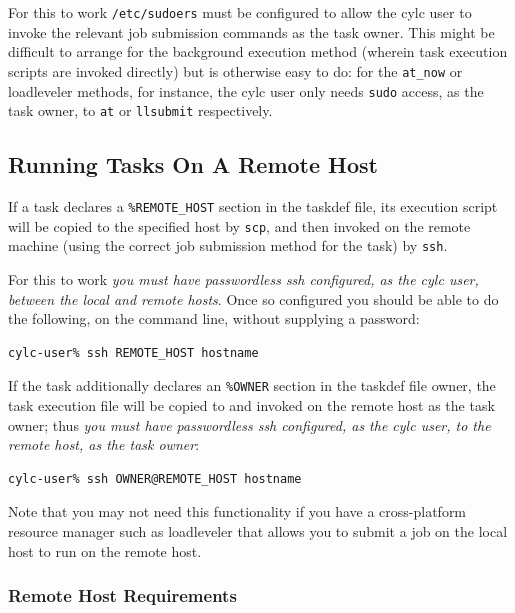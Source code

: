 \documentclass[11pt,a4paper]{article}
\begin{document}
For this to work \lstinline=/etc/sudoers= must be configured to allow
the cylc user to invoke the relevant job submission commands as the task
owner.  This might be difficult to arrange for the background execution
method (wherein task execution scripts are invoked directly) but is
otherwise easy to do: for the \lstinline=at_now= or loadleveler methods,
for instance, the cylc user only needs \lstinline=sudo= access, as the
task owner, to \lstinline=at= or \lstinline=llsubmit= respectively.

\subsection{Running Tasks On A Remote Host}
\label{RunningTasksOnARemoteHost}

If a task declares a \lstinline=%REMOTE_HOST= section in the taskdef
file, its execution script will be copied to the specified host by 
\lstinline=scp=, and then invoked on the remote machine (using the
correct job submission method for the task) by \lstinline=ssh=. 

For this to work {\em you must have passwordless ssh configured, as 
the cylc user, between the local and remote hosts}. Once so configured
you should be able to do the following, on the command line, without
supplying a password:

\begin{lstlisting}
cylc-user% ssh REMOTE_HOST hostname
\end{lstlisting}

If the task additionally declares an \lstinline=%OWNER= section in the
taskdef file owner, the task execution file will be copied to and
invoked on the remote host as the task owner; thus {\em you must have
passwordless ssh configured, as the cylc user, to the remote host, as
the task owner}:

\begin{lstlisting}
cylc-user% ssh OWNER@REMOTE_HOST hostname
\end{lstlisting}

Note that you may not need this functionality if you have a
cross-platform resource manager such as loadleveler that allows 
you to submit a job on the local host to run on the remote host.

\subsubsection{Remote Host Requirements}
\end{document}
